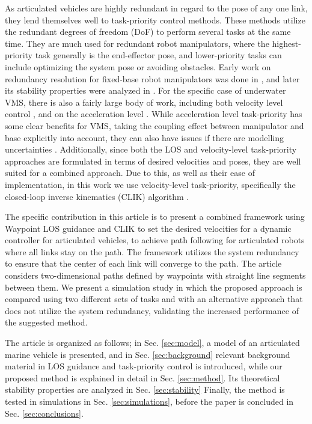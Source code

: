 \documentclass[../main.tex]{subfiles}
\begin{document}
As articulated vehicles are highly redundant in regard to the pose of any one link, they lend themselves well to task-priority control methods. These methods utilize the redundant degrees of freedom (DoF) to perform several tasks at the same time. They are much used for redundant robot manipulators, where the highest-priority task generally is the end-effector pose, and lower-priority tasks can include optimizing the system pose or avoiding obstacles. Early work on redundancy resolution for fixed-base robot manipulators was done in \cite{Nakamura1987,chiaverini1997}, and later its stability properties were analyzed in \cite{antonelli2009}. For the specific case of underwater VMS, there is also a fairly large body of work, including both velocity level control \citep{antonelli1998,borlaug2020a}, and on the acceleration level \citep{brantner2021,saebo2022}. While acceleration level task-priority has some clear benefits for VMS, taking the coupling effect between manipulator and base explicitly into account, they can also have issues if there are modelling uncertainties \citep{iversflaten2023}. Additionally, since both the LOS and velocity-level task-priority approaches are formulated in terms of desired velocities and poses, they are well suited for a combined approach. Due to this, as well as their ease of implementation, in this work we use velocity-level task-priority, specifically the closed-loop inverse kinematics (CLIK) algorithm \citep{antonelli2009}.

The specific contribution in this article is to present a combined framework using Waypoint LOS guidance and CLIK to set the desired velocities for a dynamic controller for articulated vehicles, to achieve path following for articulated robots where all links stay on the path. The framework utilizes the system redundancy to ensure that the center of each link will converge to the path. The article considers two-dimensional paths defined by waypoints with straight line segments between them. We present a simulation study in which the proposed approach is compared using two different sets of tasks and with an alternative approach that does not utilize the system redundancy, validating the increased performance of the suggested method.

The article is organized as follows; in Sec. \ref{sec:model}, a model of an articulated marine vehicle is presented, and in Sec. \ref{sec:background} relevant background material in LOS guidance and task-priority control is introduced, while our proposed method is explained in detail in Sec. \ref{sec:method}. Its theoretical stability properties are analyzed in Sec. \ref{sec:stability} Finally, the method is tested in simulations in Sec. \ref{sec:simulations}, before the paper is concluded in Sec. \ref{sec:conclusions}.
\end{document}
